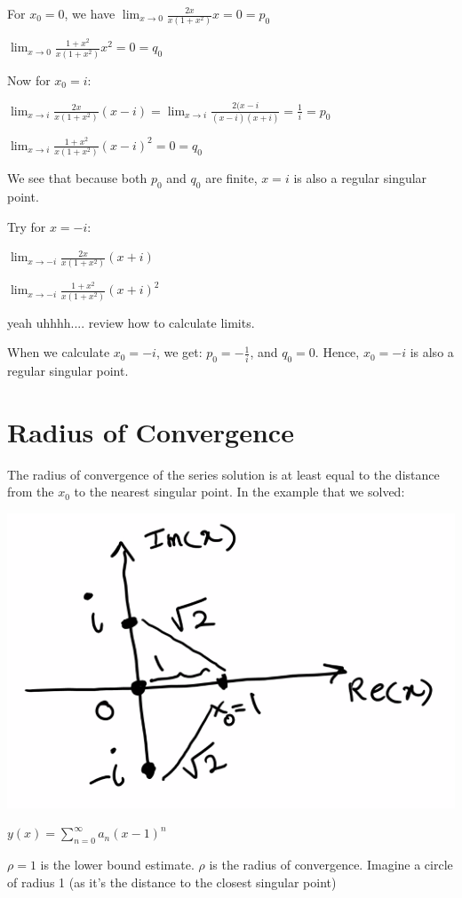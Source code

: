 For $x_0 = 0$, we have $\lim_{x \to 0} \frac{2x}{x(1+x^2)} x = 0 = p_0$

$\lim_{x \to 0} \frac{1+x^2}{x(1+x^2)} x^2 = 0 = q_0$

\hfill \break 

Now for $x_0 = i$:

$\lim_{x \to i} \frac{2x}{x (1+x^2)} (x - i) = \lim_{x \to i} \frac{2(x-i}{(x-i)(x+i)} = \frac{1}{i} = p_0$

$\lim_{x \to i} \frac{1+x^2}{x(1+x^2)} (x-i)^2 = 0 = q_0$

We see that because both $p_0$ and $q_0$ are finite, $x = i$ is also a regular singular point. 

Try for $x = -i$:

$\lim_{x \to -i} \frac{2x}{x (1+x^2)} (x+i)$

$\lim_{x \to -i} \frac{1+x^2}{x(1+x^2)} (x+i)^2$

yeah uhhhh.... review how to calculate limits. 

When we calculate $x_0 = -i$, we get: $p_0 = -\frac{1}{i}$, and $q_0 = 0$. Hence, $x_0 = -i$ is also a regular singular point. 

\section{Radius of Convergence}

The radius of convergence of the series solution is at least equal to the distance from the $x_0$ to the nearest singular point. In the example that we solved:

\includegraphics[width = 0.7 \textwidth]{image2.png}

$y(x) = \sum_{n = 0}^{\infty} a_n (x-1)^n$

$\rho = 1$ is the lower bound estimate. $\rho$ is the radius of convergence. Imagine a circle of radius 1 (as it's the distance to the closest singular point)

